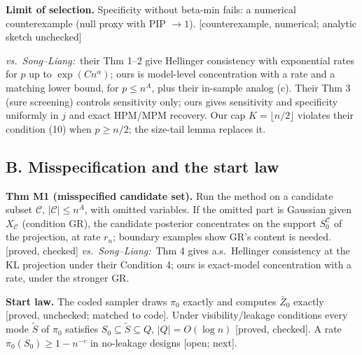 \documentclass[10pt]{article}
\newcommand{\st}[1]{\textsf{\small[#1]}}
\newcommand{\SL}{\textit{vs.\ Song--Liang:}~}
\begin{document}
\textbf{Limit of selection.} Specificity without beta-min fails: a numerical counterexample (null proxy with PIP $\to1$).
\st{counterexample, numerical; analytic sketch unchecked}

\SL their Thm 1--2 give Hellinger consistency with exponential rates for $p$ up to $\exp(Cn^\alpha)$; ours is model-level concentration with a rate and a matching lower bound, for $p\le n^A$, plus their in-sample analog (c). Their Thm 3 (sure screening) controls sensitivity only; ours gives sensitivity and specificity uniformly in $j$ and exact HPM/MPM recovery. Our cap $K=\lfloor n/2\rfloor$ violates their condition (10) when $p\ge n/2$; the size-tail lemma replaces it.

\subsection*{B. Misspecification and the start law}
\textbf{Thm M1 (misspecified candidate set).} Run the method on a candidate subset $\mathcal C$, $|\mathcal C|\le n^A$, with omitted variables. If the omitted part is Gaussian given $X_{\mathcal C}$ (condition GR), the candidate posterior concentrates on the support $S_0^{\mathcal C}$ of the projection, at rate $r_n$; boundary examples show GR's content is needed.
\st{proved, checked} \SL Thm 4 gives a.s.\ Hellinger consistency at the KL projection under their Condition 4; ours is exact-model concentration with a rate, under the stronger GR.

\textbf{Start law.} The coded sampler draws $\pi_0$ exactly and computes $\bar Z_0$ exactly \st{proved, unchecked; matched to code}. Under visibility/leakage conditions every mode $\tilde S$ of $\pi_0$ satisfies $S_0\subseteq\tilde S\subseteq Q$, $|Q|=O(\log n)$ \st{proved, checked}. A rate $\pi_0(S_0)\ge1-n^{-c}$ in no-leakage designs \st{open; next}.
\end{document}

